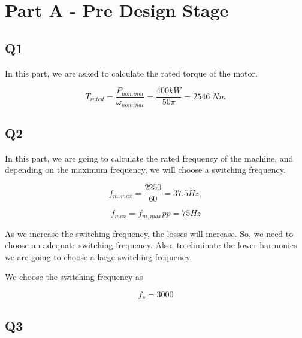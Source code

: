 \section{Part A - Pre Design Stage}
\subsection{Q1}
In this part, we are asked to calculate the rated torque of the motor.

\begin{equation}
    T_{rated} = \dfrac{P_{nominal}}{\omega_{nominal}} = \dfrac{400kW}{50\pi} = 2546 \; Nm
\end{equation}

\subsection{Q2}
In this part, we are going to calculate the rated frequency of the machine, and depending on the maximum frequency, we will choose a switching frequency.

\begin{equation}
    f_{m,max} = \dfrac{2250}{60} = 37.5 Hz,
\end{equation}

\begin{equation}
    f_{max} = f_{m,max} pp = 75 Hz
\end{equation}

As we increase the switching frequency, the losses will increase. So, we need to choose an adequate switching frequency. Also, to eliminate the lower harmonics we are going to choose a large switching frequency.

We choose the switching frequency as

\begin{equation}
    f_s = 3000
\end{equation}

\subsection{Q3}
